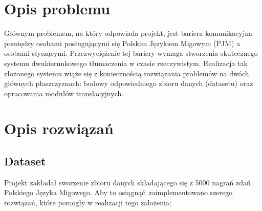 \documentclass[12pt]{article}
\begin{document}

\section{Opis problemu}
Głównym problemem, na który odpowiada projekt, jest bariera komunikacyjna pomiędzy osobami posługującymi się Polskim Językiem Migowym (PJM) a osobami słyszącymi. Przezwyciężenie tej bariery wymaga stworzenia skutecznego systemu dwukierunkowego tłumaczenia w czasie rzeczywistym. Realizacja tak złożonego systemu wiąże się z koniecznością rozwiązania problemów na dwóch głównych płaszczyznach: budowy odpowiedniego zbioru danych (datasetu) oraz opracowania modułów translacyjnych.

\section{Opis rozwiązań}

\subsection{Dataset} \label{sec:dataset}

Projekt zakładał sworzenie zbioru danych składającego się z 5000 nagrań zdań Polskiego Języka Migowego. Aby to osiągnąć zaimplementowano szerego rozwiązań, które pomogły w realizacji tego założenia: 
\end{document}

